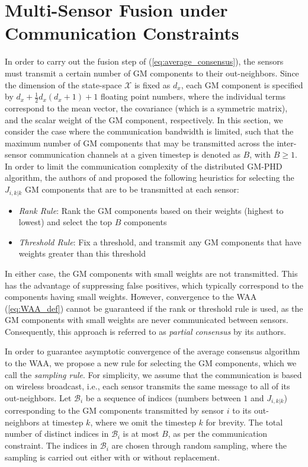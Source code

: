 \section{Multi-Sensor Fusion under Communication Constraints}
\label{sec:comm_constr}

In order to carry out the fusion step of (\ref{eq:average_consensus}), the sensors must transmit a certain number of GM components to their out-neighbors. Since the dimension of the state-space $\mathcal X$ is fixed as $d_x$, each GM component is specified by $d_x + \tfrac{1}{2}d_x(d_x + 1) + 1$ floating point numbers, where the individual terms correspond to the mean vector, the covariance (which is a symmetric matrix), and the scalar weight of the GM component, respectively. In this section, we consider the case where the communication bandwidth is limited, such that the maximum number of GM components that may be transmitted across the inter-sensor communication channels at a given timestep is denoted as $B$, with $B \geq 1$.
In order to limit the communication complexity of the distributed GM-PHD algorithm, the authors of \cite{li2018partial} and \cite{li2020parallel} proposed the following heuristics for selecting the $J_{i,k|k}$ GM components that are to be transmitted at each sensor:
\begin{itemize}
    \item \textit{Rank Rule}: Rank the GM components based on their weights (highest to lowest) and select the top $B$ components
    \item \textit{Threshold Rule}: Fix a threshold, and transmit any GM components that have weights greater than this threshold
\end{itemize}
In either case, the GM components with small weights are not transmitted. This has the advantage of suppressing false positives, which typically correspond to the components having small weights. However, convergence to the WAA (\ref{eq:WAA_def}) cannot be guaranteed if the rank or threshold rule is used, as the GM components with small weights are never communicated between sensors.
Consequently, this approach is referred to as \textit{partial consensus} by its authors.

In order to guarantee asymptotic convergence of the average consensus algorithm to the WAA, we propose a new rule for selecting the GM components, which we call the \textit{sampling rule}. For simplicity, we assume that the communication is based on wireless broadcast, i.e., each sensor transmits the same message to all of its out-neighbors. Let $\mathcal B_{i}$ be a sequence of indices (numbers between $1$ and $J_{i,k|k}$) corresponding to the GM components transmitted by sensor $i$ to its out-neighbors at timestep $k$, where we omit the timestep $k$ for brevity. The total number of distinct indices in $\mathcal B_i$ is at most $B$, as per the communication constraint. The indices in $\mathcal B_i$ are chosen through random sampling, where the sampling is carried out either with or without replacement.

